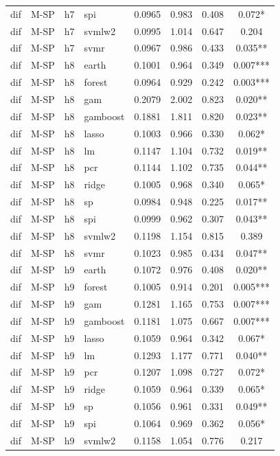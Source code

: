 \begin{ThreePartTable}
\begin{longtable}[t]{llclcccc}
dif & M-SP & h7 & spi & 0.0965 & 0.983 & 0.408 & 0.072*\\
dif & M-SP & h7 & svmlw2 & 0.0995 & 1.014 & 0.647 & 0.204\\
dif & M-SP & h7 & svmr & 0.0967 & 0.986 & 0.433 & 0.035**\\
\addlinespace
dif & M-SP & h8 & earth & 0.1001 & 0.964 & 0.349 & 0.007***\\
dif & M-SP & h8 & forest & 0.0964 & 0.929 & 0.242 & 0.003***\\
dif & M-SP & h8 & gam & 0.2079 & 2.002 & 0.823 & 0.020**\\
dif & M-SP & h8 & gamboost & 0.1881 & 1.811 & 0.820 & 0.023**\\
dif & M-SP & h8 & lasso & 0.1003 & 0.966 & 0.330 & 0.062*\\
dif & M-SP & h8 & lm & 0.1147 & 1.104 & 0.732 & 0.019**\\
dif & M-SP & h8 & pcr & 0.1144 & 1.102 & 0.735 & 0.044**\\
dif & M-SP & h8 & ridge & 0.1005 & 0.968 & 0.340 & 0.065*\\
dif & M-SP & h8 & sp & 0.0984 & 0.948 & 0.225 & 0.017**\\
dif & M-SP & h8 & spi & 0.0999 & 0.962 & 0.307 & 0.043**\\
dif & M-SP & h8 & svmlw2 & 0.1198 & 1.154 & 0.815 & 0.389\\
dif & M-SP & h8 & svmr & 0.1023 & 0.985 & 0.434 & 0.047**\\
\addlinespace
dif & M-SP & h9 & earth & 0.1072 & 0.976 & 0.408 & 0.020**\\
dif & M-SP & h9 & forest & 0.1005 & 0.914 & 0.201 & 0.005***\\
dif & M-SP & h9 & gam & 0.1281 & 1.165 & 0.753 & 0.007***\\
dif & M-SP & h9 & gamboost & 0.1181 & 1.075 & 0.667 & 0.007***\\
dif & M-SP & h9 & lasso & 0.1059 & 0.964 & 0.342 & 0.067*\\
dif & M-SP & h9 & lm & 0.1293 & 1.177 & 0.771 & 0.040**\\
dif & M-SP & h9 & pcr & 0.1207 & 1.098 & 0.727 & 0.072*\\
dif & M-SP & h9 & ridge & 0.1059 & 0.964 & 0.339 & 0.065*\\
dif & M-SP & h9 & sp & 0.1056 & 0.961 & 0.331 & 0.049**\\
dif & M-SP & h9 & spi & 0.1064 & 0.969 & 0.362 & 0.056*\\
dif & M-SP & h9 & svmlw2 & 0.1158 & 1.054 & 0.776 & 0.217\\

\end{longtable}
\end{ThreePartTable}

